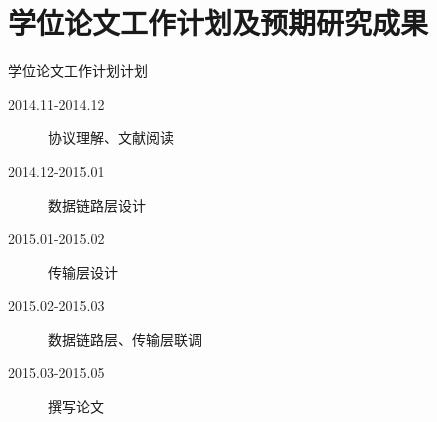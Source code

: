 \documentclass{beamer}
\begin{document}
\section{学位论文工作计划及预期研究成果}

\begin{frame}{学位论文工作计划}{计划}
	\begin{description}
	\item[2014.11-2014.12] 协议理解、文献阅读
	\item[2014.12-2015.01] 数据链路层设计
	\item[2015.01-2015.02] 传输层设计
	\item[2015.02-2015.03] 数据链路层、传输层联调
	\item[2015.03-2015.05] 撰写论文
	\end{description}
\end{frame}
\end{document}
